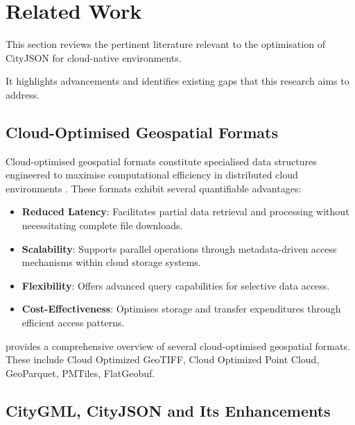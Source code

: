 
\chapter{Related Work}
\label{rw:related_work}

This section reviews the pertinent literature relevant to the optimisation of CityJSON for cloud-native environments.

It highlights advancements and identifies existing gaps that this research aims to address.

\section{Cloud-Optimised Geospatial Formats}
\label{rw:cloud_optimised_formats}

Cloud-optimised geospatial formats constitute specialised data structures engineered to maximise computational efficiency in distributed cloud environments \citep{cloud-optimised-formats}.
These formats exhibit several quantifiable advantages:

\begin{itemize}
  \item \textbf{Reduced Latency}: Facilitates partial data retrieval and processing without necessitating complete file downloads.
  \item \textbf{Scalability}: Supports parallel operations through metadata-driven access mechanisms within cloud storage systems.
  \item \textbf{Flexibility}: Offers advanced query capabilities for selective data access.
  \item \textbf{Cost-Effectiveness}: Optimises storage and transfer expenditures through efficient access patterns.
\end{itemize}

\citet{cloud-optimised-formats} provides a comprehensive overview of several cloud-optimised geospatial formats.
These include Cloud Optimized GeoTIFF, Cloud Optimized Point Cloud, GeoParquet, PMTiles, FlatGeobuf.

\section{CityGML, CityJSON and Its Enhancements}
\label{rw:cityjson_enhancements}

